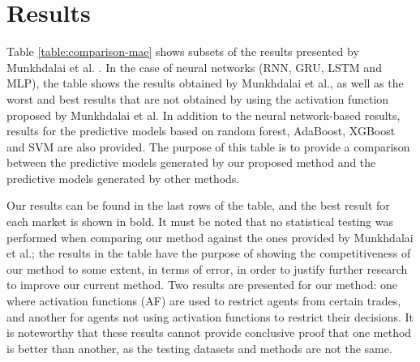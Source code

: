 ﻿\documentclass{ieeeaccess}
\begin{document}
\section{Results}
\label{section:results}

Table \ref{table:comparison-mae} shows
subsets of the results presented by Munkhdalai et
al. \cite{Munkhdalai2019}. In the case of neural networks (RNN, GRU,
LSTM and MLP), the table shows the results obtained by Munkhdalai et
al., as well as the worst and best results that are not obtained by
using the activation function proposed by Munkhdalai et al. In
addition to the neural network-based results, results for the
predictive models based on random forest, AdaBoost, XGBoost and
SVM are also provided. The purpose of this table
is to provide a comparison between the predictive models generated by
our proposed method and the predictive models generated by other
methods.

Our results can be found in the last rows of the table, and the best
result for each market is shown in bold. It must be noted that no
statistical testing was performed when comparing our method against
the ones provided by Munkhdalai et al.; the results in the table
have the purpose of showing the competitiveness of our method to some
extent, in terms of error, in order to justify further research to
improve our current method. %
Two results are presented for
our method: one where activation functions (AF) are used to restrict agents
from certain trades, and another for agents not using activation
functions to restrict their decisions. It is noteworthy that these
results cannot provide conclusive proof that one method is better than
another, as the testing datasets and methods are not the
same. %

\end{document}
